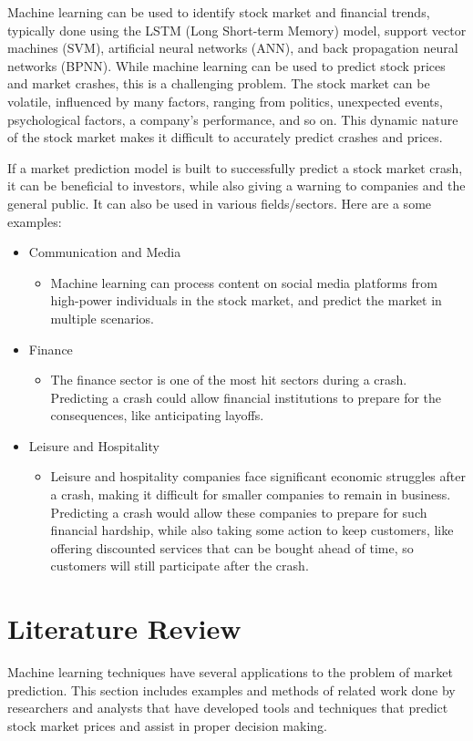 \documentclass{article}
\begin{document}
Machine learning can be used to identify stock market and financial trends, typically done using the LSTM (Long Short-term Memory) model, support vector machines (SVM), artificial neural networks (ANN), and back propagation neural networks (BPNN). While machine learning can be used to predict stock prices and market crashes, this is a challenging problem. The stock market can be volatile, influenced by many factors, ranging from politics, unexpected events, psychological factors, a company’s performance, and so on. This dynamic nature of the stock market makes it difficult to accurately predict crashes and prices.

If a market prediction model is built to successfully predict a stock market crash, it can be beneficial to investors, while also giving a warning to companies and the general public. It can also be used in various fields/sectors. Here are a some examples: 

	\begin{itemize}
		\item Communication and Media
			\begin{itemize}
				\item Machine learning can process content on social media platforms from high-power individuals in the stock market, and predict the market in multiple scenarios.   
			\end{itemize}
		\item Finance
			\begin{itemize}
				\item The finance sector is one of the most hit sectors during a crash. Predicting a crash could allow financial institutions to prepare for the consequences, like anticipating layoffs.
			\end{itemize}
		\item Leisure and Hospitality 
			\begin{itemize}
				\item Leisure and hospitality companies face significant economic struggles after a crash, making it difficult for smaller companies to remain in business. Predicting a crash would allow these companies to prepare for such financial hardship, while also taking some action to keep customers, like offering discounted services that can be bought ahead of time, so customers will still participate after the crash. 
			\end{itemize}
	\end{itemize}
 
\section{Literature Review} 
Machine learning techniques have several applications to the problem of market prediction. This section includes examples and methods of related work done by researchers and analysts that have developed tools and techniques that predict stock market prices and assist in proper decision making.
\end{document}
